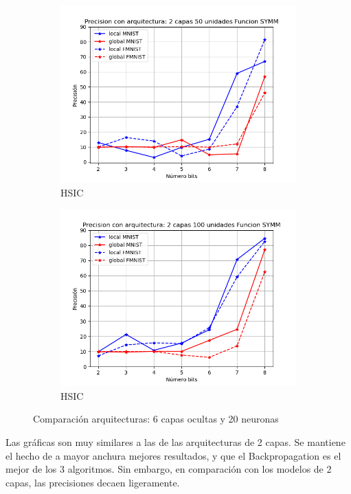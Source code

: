 \begin{figure}[H]
\begin{subfigure}[H]{0.475\textwidth}
    \includegraphics[width=\textwidth]{imagenes/HSIC/Precision con arquitectura: 2 capas 50 unidades Funcion SYMM.png}
    \caption{HSIC}
    \end{subfigure}
    \begin{subfigure}[H]{0.475\textwidth}
    \includegraphics[width=\textwidth]{imagenes/HSIC/Precision con arquitectura: 2 capas 100 unidades Funcion SYMM.png}
    \caption{HSIC}
    \end{subfigure}
    \caption{Comparación arquitecturas: 6 capas ocultas y 20 neuronas}
\end{figure}

Las gráficas son muy similares a las de las arquitecturas de 2 capas. Se mantiene el hecho de a mayor anchura mejores resultados, y que el Backpropagation es el mejor de los 3 algoritmos. Sin embargo, en comparación con los modelos de 2 capas, las precisiones decaen ligeramente.

